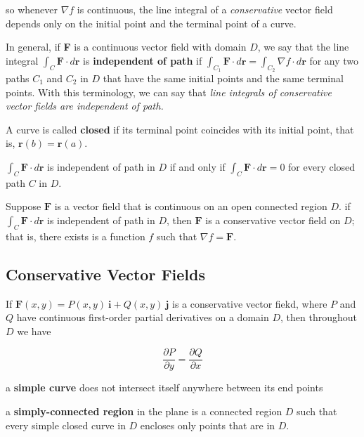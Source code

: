 \documentclass{article}
\begin{document}
so whenever $\nabla f$ is continuous, the line integral of a \textit{conservative} vector field depends only on the initial point and the terminal point of a curve.

In general, if \textbf{F} is a continuous vector field with domain $D$, we say that the line integral $\int_C \mathbf{F} \cdot d \mathbf{r}$ is \textbf{independent of path} if $\int_{C_1} \mathbf{F} \cdot d \mathbf{r} = \int_{C_2} \nabla f \cdot d \mathbf{r}$ for any two paths $C_1$ and $C_2$ in $D$ that have the same initial points and the same terminal points. With this terminology, we can say that \textit{line integrals of conservative vector fields are independent of path.}

A curve is called \textbf{closed} if its terminal point coincides with its initial point, that is, $\mathbf{r}(b) = \mathbf{r}(a)$.

\begin{center}
    $\int_C \mathbf{F} \cdot d \mathbf{r}$ is independent of path in $D$ if and only if $\int_C \mathbf{F} \cdot d \mathbf{r} = 0$ for every closed path $C$ in $D$. 
\end{center}

\begin{center}
    Suppose $\mathbf{F}$ is a vector field that is continuous on an open connected region $D$. if $\int_C \mathbf{F} \cdot d \mathbf{r}$ is independent of path in $D$, then $\mathbf{F}$ is a conservative vector field on $D$; that is, there exists is a function $f$ such that $\nabla f = \mathbf{F}$. 
\end{center}

\subsection{Conservative Vector Fields}

If $\mathbf{F}(x,y) = P(x,y) \ \mathbf{i}  + Q(x,y) \ \mathbf{j}$ is a conservative vector fiekd, where $P$ and $Q$ have continuous first-order partial derivatives on a domain $D$, then throughout $D$ we have 

\begin{equation*}
    \frac{\partial P}{\partial y} = \frac{\partial Q}{\partial x}
\end{equation*}

a \textbf{simple curve} does not intersect itself anywhere between its end points

a \textbf{simply-connected region} in the plane is a connected region $D$  such that every simple closed curve in $D$ encloses only points that are in $D$.
\end{document}
